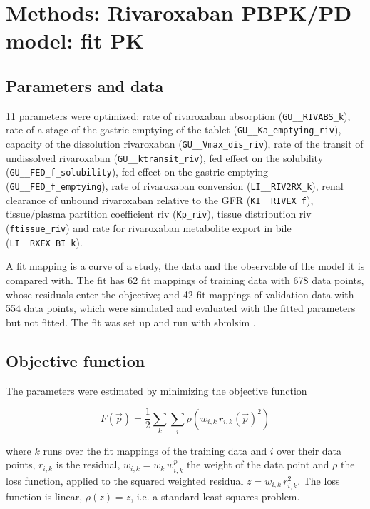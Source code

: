 \section{Methods: Rivaroxaban PBPK/PD model: fit PK}

\subsection{Parameters and data}

11 parameters were optimized: rate of rivaroxaban absorption (\texttt{GU\_\_RIVABS\_k}), rate of a stage of the gastric emptying of the tablet (\texttt{GU\_\_Ka\_emptying\_riv}), capacity of the dissolution rivaroxaban (\texttt{GU\_\_Vmax\_dis\_riv}), rate of the transit of undissolved rivaroxaban (\texttt{GU\_\_ktransit\_riv}), fed effect on the solubility (\texttt{GU\_\_FED\_f\_solubility}), fed effect on the gastric emptying (\texttt{GU\_\_FED\_f\_emptying}), rate of rivaroxaban conversion (\texttt{LI\_\_RIV2RX\_k}), renal clearance of unbound rivaroxaban relative to the GFR (\texttt{KI\_\_RIVEX\_f}), tissue/plasma partition coefficient riv (\texttt{Kp\_riv}), tissue distribution riv (\texttt{ftissue\_riv}) and rate for rivaroxaban metabolite export in bile (\texttt{LI\_\_RXEX\_BI\_k}).

A fit mapping is a curve of a study, the data and the observable of the model it is compared with. The fit has 62 fit mappings of training data with 678 data points, whose residuals enter the objective; and 42 fit mappings of validation data with 554 data points, which were simulated and evaluated with the fitted parameters but not fitted. The fit was set up and run with sbmlsim \cite{Koenig2026_sbmlsim}.

\subsection{Objective function}

The parameters were estimated by minimizing the objective function

\begin{equation}
F(\vec{p}) = \frac{1}{2} \sum_{k} \sum_{i} \rho\left(w_{i,k}\, r_{i,k}(\vec{p})^2\right)
\end{equation}

where $k$ runs over the fit mappings of the training data and $i$ over their data points, $r_{i,k}$ is the residual, $w_{i,k} = w_k\, w^{p}_{i,k}$ the weight of the data point and $\rho$ the loss function, applied to the squared weighted residual $z = w_{i,k}\, r_{i,k}^2$. The loss function is linear, $\rho(z) = z$, i.e. a standard least squares problem.

